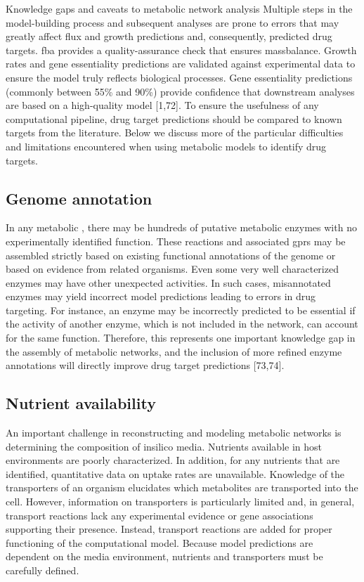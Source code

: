 \begin{pabox}[label=trends:box:caveats]{Knowledge gaps and caveats to metabolic network analysis}
Multiple steps in the model-building process and subsequent 
analyses are prone to errors that may greatly affect \gls{flux} 
and growth predictions and, consequently, predicted drug 
targets. \gls{fba} provides a quality-assurance check that ensures 
\gls{massbalance}. Growth rates and gene essentiality predictions 
are validated against experimental data to ensure the 
model truly reflects biological processes. Gene essentiality 
predictions (commonly between 55\% and 90\%) provide 
confidence that downstream analyses are based on a 
high-quality model [1,72]. To ensure the usefulness of 
any computational pipeline, drug target predictions 
should be compared to known targets from the literature. 
Below we discuss more of the particular difficulties and 
limitations encountered when using metabolic models to 
identify drug targets.

\subsection*{Genome annotation}
In any metabolic , there may be 
hundreds of putative metabolic enzymes with no 
experimentally identified function. These reactions 
and associated \glspl{gpr} may be assembled 
strictly based on existing functional annotations 
of the genome or based on evidence from related 
organisms. Even some very well characterized enzymes 
may have other unexpected activities. In such cases, 
misannotated enzymes may yield incorrect model 
predictions leading to errors in drug targeting. For 
instance, an enzyme may be incorrectly predicted to be 
essential if the activity of another enzyme, which is 
not included in the network, can account for the same function. 
Therefore, this represents one important knowledge gap in 
the assembly of metabolic networks, and the inclusion of 
more refined enzyme annotations will directly improve 
drug target predictions [73,74].

\subsection*{Nutrient availability}
An important challenge in reconstructing and modeling 
metabolic networks is determining the composition of 
\gls{insilico} media. Nutrients available in host environments 
are poorly characterized. In addition, for any nutrients 
that are identified, quantitative data on uptake rates 
are unavailable. Knowledge of the transporters of an 
organism elucidates which metabolites are transported 
into the cell. However, information on transporters 
is particularly limited and, in general, transport 
reactions lack any experimental evidence or gene 
associations supporting their presence. Instead, 
transport reactions are added for proper functioning 
of the computational model. Because model predictions are 
dependent on the media environment, nutrients and 
transporters must be carefully defined.


\end{pabox}
